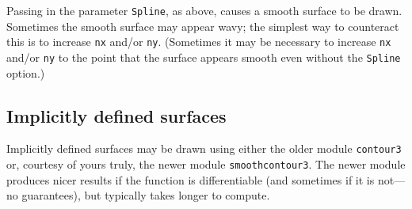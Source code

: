 \documentclass{article}
\begin{document}
Passing in the parameter \lstinline!Spline!, as above, causes a smooth surface to be drawn. Sometimes 
the smooth surface may appear wavy; the simplest way to counteract this is to increase \lstinline!nx! and/or 
\lstinline!ny!. (Sometimes it may be necessary to increase \lstinline!nx! and/or \lstinline!ny! to the point that 
the surface appears smooth even without the \lstinline!Spline! option.)

\subsection{Implicitly defined surfaces}
%
Implicitly defined surfaces may be drawn using either the older module
\lstinline!contour3! or, courtesy of yours truly, the newer module
\lstinline!smoothcontour3!. The newer module produces nicer results if the
function is differentiable (and sometimes if it is not---no guarantees), but
typically takes longer to compute.
\end{document}

